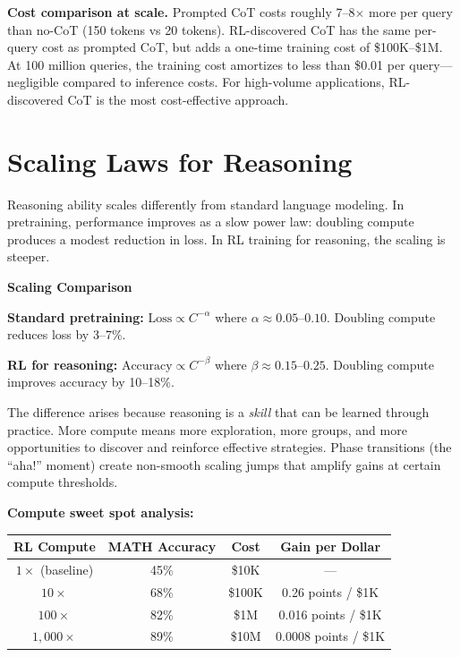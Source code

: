 \begin{chapterenv}
\begin{tipbox}
\textbf{Cost comparison at scale.} Prompted CoT costs roughly 7--8$\times$ more per query than no-CoT (150 tokens vs 20 tokens). RL-discovered CoT has the same per-query cost as prompted CoT, but adds a one-time training cost of \$100K--\$1M. At 100 million queries, the training cost amortizes to less than \$0.01 per query---negligible compared to inference costs. For high-volume applications, RL-discovered CoT is the most cost-effective approach.
\end{tipbox}

\section{Scaling Laws for Reasoning}

Reasoning ability scales differently from standard language modeling. In pretraining, performance improves as a slow power law: doubling compute produces a modest reduction in loss. In RL training for reasoning, the scaling is steeper.

\begin{infobox}
\textbf{Scaling Comparison}

\textbf{Standard pretraining:} $\text{Loss} \propto C^{-\alpha}$ where $\alpha \approx 0.05$--$0.10$. Doubling compute reduces loss by 3--7\%.

\textbf{RL for reasoning:} $\text{Accuracy} \propto C^{-\beta}$ where $\beta \approx 0.15$--$0.25$. Doubling compute improves accuracy by 10--18\%.

The difference arises because reasoning is a \textit{skill} that can be learned through practice. More compute means more exploration, more groups, and more opportunities to discover and reinforce effective strategies. Phase transitions (the ``aha!'' moment) create non-smooth scaling jumps that amplify gains at certain compute thresholds.
\end{infobox}

\textbf{Compute sweet spot analysis:}

\begin{center}
\begin{tabular}{cccc}
\toprule
\textbf{RL Compute} & \textbf{MATH Accuracy} & \textbf{Cost} & \textbf{Gain per Dollar} \\
\midrule
$1\times$ (baseline) & 45\% & \$10K & --- \\
$10\times$ & 68\% & \$100K & 0.26 points / \$1K \\
$100\times$ & 82\% & \$1M & 0.016 points / \$1K \\
$1{,}000\times$ & 89\% & \$10M & 0.0008 points / \$1K \\
\bottomrule
\end{tabular}
\end{center}


\end{chapterenv}
